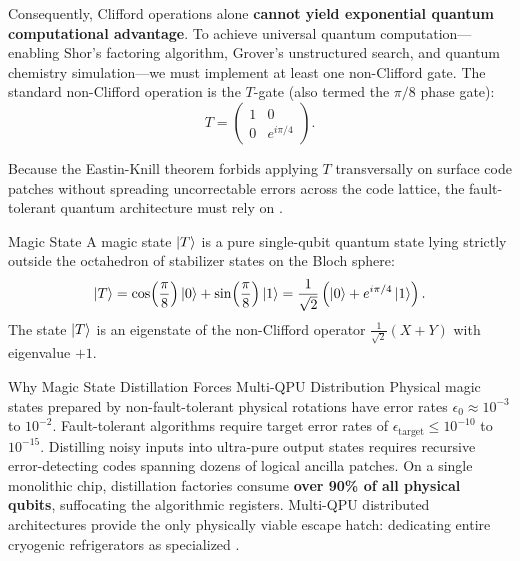 Consequently, Clifford operations alone \textbf{cannot yield exponential quantum computational advantage}. To achieve universal quantum computation---enabling Shor's factoring algorithm, Grover's unstructured search, and quantum chemistry simulation---we must implement at least one non-Clifford gate. The standard non-Clifford operation is the $T$-gate (also termed the $\pi/8$ phase gate):
\begin{equation}
    T = \begin{pmatrix} 1 & 0 \\ 0 & e^{i\pi/4} \end{pmatrix}.
    \label{eq:t_gate_matrix_ch14_exp}
\end{equation}

Because the Eastin-Knill theorem forbids applying $T$ transversally on surface code patches without spreading uncorrectable errors across the code lattice, the fault-tolerant quantum architecture must rely on .

\begin{definitionbox}{Magic State}
A magic state $\ket{T}$ is a pure single-qubit quantum state lying strictly outside the octahedron of stabilizer states on the Bloch sphere:
\begin{equation}
    \ket{T} = \cos\!\left(\frac{\pi}{8}\right) \ket{0} + \sin\!\left(\frac{\pi}{8}\right) \ket{1} = \frac{1}{\sqrt{2}} \left( \ket{0} + e^{i\pi/4} \ket{1} \right).
    \label{eq:magic_state_ch14_exp}
\end{equation}
The state $\ket{T}$ is an eigenstate of the non-Clifford operator $\frac{1}{\sqrt{2}}(X + Y)$ with eigenvalue $+1$.
\end{definitionbox}

\begin{insightbox}{Why Magic State Distillation Forces Multi-QPU Distribution}
Physical magic states prepared by non-fault-tolerant physical rotations have error rates $\epsilon_0 \approx 10^{-3}$ to $10^{-2}$. Fault-tolerant algorithms require target error rates of $\epsilon_{\text{target}} \le 10^{-10}$ to $10^{-15}$. Distilling noisy inputs into ultra-pure output states requires recursive error-detecting codes spanning dozens of logical ancilla patches. On a single monolithic chip, distillation factories consume \textbf{over 90\% of all physical qubits}, suffocating the algorithmic registers. Multi-QPU distributed architectures provide the only physically viable escape hatch: dedicating entire cryogenic refrigerators as specialized .
\end{insightbox}

